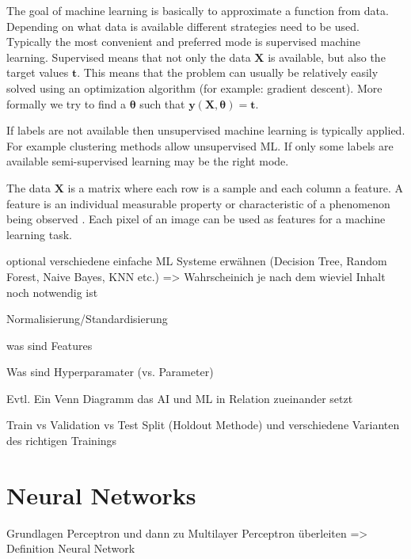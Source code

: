 \documentclass[draft,final,oneside]{vutinfth} %
\begin{document}

The goal of machine learning is basically to approximate a function from data. Depending on what data is available different strategies need to be used. Typically the most convenient and preferred mode is supervised machine learning. Supervised means that not only the data $\boldsymbol{X}$ is available, but also the target values $\boldsymbol{t}$. This means that the problem can usually be relatively easily solved using an optimization algorithm (for example: gradient descent). More formally we try to find a $\boldsymbol{\theta}$ such that $\boldsymbol{y}(\boldsymbol{X}, \boldsymbol{\theta}) = \boldsymbol{t}$.

If labels are not available then unsupervised machine learning is typically applied. For example clustering methods allow unsupervised ML. If only some labels are available semi-supervised learning may be the right mode.

The data $\boldsymbol{X}$ is a matrix where each row is a sample and each column a feature. A feature is an individual measurable property or characteristic of a phenomenon being observed \citep{bishop}. Each pixel of an image can be used as features for a machine learning task.





optional verschiedene einfache ML Systeme erwähnen (Decision Tree, Random Forest, Naive Bayes, KNN etc.) => Wahrscheinich je nach dem wieviel Inhalt noch notwendig ist

Normalisierung/Standardisierung

was sind Features

Was sind Hyperparamater (vs. Parameter)

Evtl. Ein Venn Diagramm das AI und ML in Relation zueinander setzt

Train vs Validation vs Test Split (Holdout Methode) und verschiedene Varianten des richtigen Trainings

\section{Neural Networks}
Grundlagen Perceptron und dann zu Multilayer Perceptron überleiten => Definition Neural Network
\end{document}
